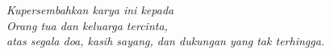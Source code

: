 
\chapter*{}
\thispagestyle{plain}

\vspace*{\fill}

\begin{center}
\textit{
Kupersembahkan karya ini kepada\\[0.3cm]
Orang tua dan keluarga tercinta,\\
atas segala doa, kasih sayang, dan dukungan yang tak terhingga.
}
\end{center}

\vspace*{\fill}
